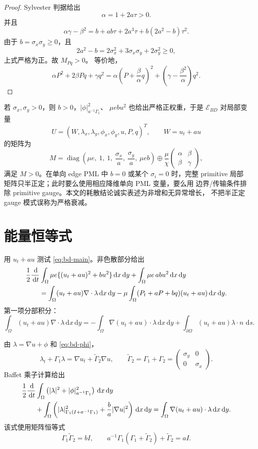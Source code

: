 \documentclass[UTF8,a4paper,11pt]{ctexart}
\newcommand{\dd}{\,\mathrm d}
\newcommand{\sx}{\sigma_x}
\newcommand{\sy}{\sigma_y}
\newcommand{\Ecal}{\mathcal E}
\newcommand{\diag}{\operatorname{diag}}
\begin{document}
\begin{proof}
Sylvester 判据给出
\[
\alpha=1+2a\tau>0.
\]
并且
\[
\alpha\gamma-\beta^2
=b+ab\tau+2a^3\tau+b(2a^2-b)\tau^2.
\]
由于 \(b=\sx\sy\ge0\)，且
\[
2a^2-b=2\sx^2+3\sx\sy+2\sy^2\ge0,
\]
上式严格为正。故 \(M_{Pq}>0\)。
等价地，
\[
\alpha P^2+2\beta Pq+\gamma q^2
=\alpha\left(P+\frac{\beta}{\alpha}q\right)^2
+\left(\gamma-\frac{\beta^2}{\alpha}\right)q^2.
\]
\end{proof}

若 \(\sx,\sy>0\)，则 \(b>0\)，\(|\phi|_{a^{-1}\Gamma_1}^2\)、
\(\mu e b u^2\) 也给出严格正权重，于是 \(\Ecal_{BD}\) 对局部变量
\[
U=(W,\lambda_x,\lambda_y,\phi_x,\phi_y,u,P,q)^T,\qquad W=u_t+a u
\]
的矩阵为
\[
M=\diag\!\left(
\mu e,\ 1,\ 1,\ \frac{\sx}{a},\ \frac{\sy}{a},\ \mu e b
\right)
\oplus \frac{\mu}{\chi}
\begin{pmatrix}\alpha&\beta\\ \beta&\gamma\end{pmatrix},
\]
满足 \(M>0\)。在单向 edge PML 中 \(b=0\) 或某个 \(\sigma_i=0\) 时，完整
primitive 局部矩阵只半正定；此时要么使用相应降维单向 PML 变量，要么用
边界/传输条件排除 primitive gauge。本文的耗散结论诚实表述为非增和无异常增长，
不把半正定 gauge 模式误称为严格衰减。

\section{能量恒等式}

用 \(u_t+a u\) 测试 \eqref{eq:bd-main}。非色散部分给出
\begin{align}
&\frac12\frac{\dd}{\dd t}
\int_\Omega\mu e\{(u_t+a u)^2+b u^2\}\dd x\dd y
+\int_\Omega\mu e\,ab u^2\dd x\dd y \notag\\
&\qquad
=\int_\Omega(u_t+a u)\nabla\cdot\lambda\dd x\dd y
-\mu\int_\Omega(P_t+aP+bq)(u_t+a u)\dd x\dd y.
\label{eq:step-main}
\end{align}
第一项分部积分：
\[
\int_\Omega(u_t+a u)\nabla\cdot\lambda\dd x\dd y
=-\int_\Omega\nabla(u_t+a u)\cdot\lambda\dd x\dd y
+\int_{\partial\Omega}(u_t+a u)\lambda\cdot n\,\dd s.
\]

由 \(\lambda=\nabla u+\phi\) 和 \eqref{eq:bd-phi}，
\[
\lambda_t+\Gamma_1\lambda
=\nabla u_t+\widetilde\Gamma_2\nabla u,\qquad
\widetilde\Gamma_2=\Gamma_1+\Gamma_2
=\begin{pmatrix}\sy&0\\0&\sx\end{pmatrix}.
\]
Baffet 乘子计算给出
\begin{align}
&\frac12\frac{\dd}{\dd t}
\int_\Omega\left(|\lambda|^2+|\phi|_{a^{-1}\Gamma_1}^2\right)\dd x\dd y
\notag\\
&\qquad
+\int_\Omega\left(
|\lambda|^2_{\Gamma_1(I+a^{-1}\Gamma_1)}
+\frac{b}{a}|\nabla u|^2
\right)\dd x\dd y
=\int_\Omega\nabla(u_t+a u)\cdot\lambda\dd x\dd y.
\label{eq:step-baffet}
\end{align}
该式使用矩阵恒等式
\[
\Gamma_1\widetilde\Gamma_2=bI,\qquad
a^{-1}\Gamma_1(\Gamma_1+\widetilde\Gamma_2)+\widetilde\Gamma_2=aI.
\]
\end{document}
